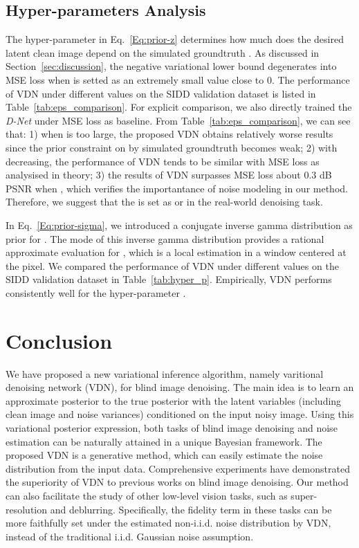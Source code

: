 \documentclass{article}
\begin{document}
\vspace{-1mm}\subsection{Hyper-parameters Analysis}\vspace{-1mm}
The hyper-parameter  in Eq.~\eqref{Eq:prior-z} determines how much does the desired latent clean
image  depend on the simulated groundtruth . As discussed in Section~\ref{sec:discussion}, the
negative variational lower bound degenerates into MSE loss when  is setted as an extremely small
value close to 0. The performance of VDN under different  values on the SIDD validation dataset
is listed in Table~\ref{tab:eps_comparison}. For explicit comparison, we also directly trained the \textit{D-Net} 
under MSE loss as baseline. From Table~\ref{tab:eps_comparison}, we can see that: 1) when  is too
large, the proposed VDN obtains relatively worse results since the prior constraint on  by simulated
groundtruth  becomes weak; 2) with  decreasing, the performance of VDN tends to be similar
with MSE loss as analysised in theory; 3) the results of VDN surpasses MSE loss about 0.3 dB PSNR
when , which verifies the importantance of noise modeling in our method. Therefore, 
we suggest that the  is set as  or  in the real-world denoising task.

In Eq.~\eqref{Eq:prior-sigma}, we introduced a conjugate inverse gamma distribution as prior for .
The mode of this inverse gamma distribution  provides a rational approximate evaluation for ,
which is a local estimation in a  window centered at the  pixel. We compared the performance
of VDN under different  values on the SIDD validation dataset in Table~\ref{tab:hyper_p}. Empirically, VDN
performs consistently well for the hyper-parameter .

\vspace{-2mm}\section{Conclusion}\vspace{-2mm}
We have proposed a new variational inference algorithm, namely varitional denoising network (VDN),
for blind image denoising. The main idea is to learn an approximate posterior to the true posterior
with the latent variables (including clean image and noise variances) conditioned on the input noisy image.
Using this variational posterior expression, both tasks of blind image denoising and noise estimation can
be naturally attained in a unique Bayesian framework. The proposed VDN is a generative method, which can easily
estimate the noise distribution from the input data. Comprehensive experiments have demonstrated the superiority
of VDN to previous works on blind image denoising. Our method can also facilitate the study of other low-level
vision tasks, such as super-resolution and deblurring. Specifically, the fidelity term in these tasks can be
more faithfully set under the estimated non-i.i.d. noise distribution by VDN, instead of the traditional
i.i.d. Gaussian noise assumption.
\end{document}
